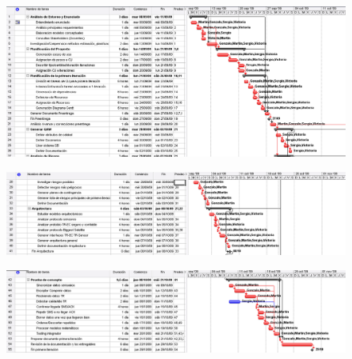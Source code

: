 \begin{figure}[H]
    \centering
    \includegraphics[scale = 0.6]{Gantt1E.png}
\end{figure}

\begin{figure}[H]
    \centering
    \includegraphics[scale = 0.6]{Gantt2aE.png}
\end{figure}

\begin{figure}[H]
    \centering
    \includegraphics[scale = 0.6]{Gantt2bE.png}
\end{figure}